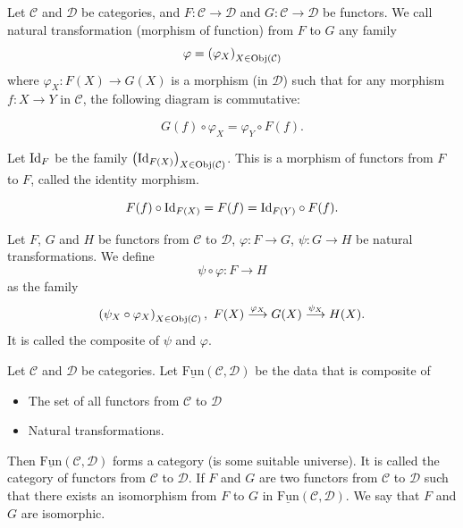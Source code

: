 \begin{definitionenv}
    Let $\mathcal{C}$ and $\mathcal{D}$ be categories, and $F:\mathcal{C}\rightarrow \mathcal{D}$ and $G:\mathcal{C}\rightarrow\mathcal{D}$ be functors. We call natural transformation (morphism of function) from $F$ to $G$ any family
    $$\varphi=\left(\varphi_X\right)_{X\in \mathrm{Obj}(\mathcal{C})}$$
    where $\varphi_X:F(X)\rightarrow G(X)$ is a morphism (in $\mathcal{D}$) such that for any morphism $f:X\rightarrow Y$ in $\mathcal{C}$, the following diagram is commutative:
    \begin{center}
\end{center}
$$G(f)\circ \varphi_X=\varphi_Y\circ F(f).$$
\end{definitionenv}
\begin{exampleenv}
    Let $\mathrm{Id}_F$ be the family $\left(\mathrm{Id}_{F(X)}\right)_{X\in \mathrm{Obj}(\mathcal{C})}$. This is a morphism of functors from $F$ to $F$, called the identity morphism.
    \begin{center}
\end{center}
$$F(f)\circ \mathrm{Id}_{F(X)} = F(f) =\mathrm{Id}_{F(Y)}\circ F(f).$$
\end{exampleenv}
\begin{exampleenv}
    Let $F$, $G$ and $H$ be functors from $\mathcal{C}$ to $\mathcal{D}$, $\varphi: F\rightarrow G$, $\psi:G\rightarrow H$ be natural transformations. We define
    $$\psi\circ \varphi: F\rightarrow H$$
    as the family 
    $$ \left(\psi_X\circ\varphi_X\right)_{X\in \Obj(\mathcal{C})},\ F(X)\overset{\varphi_X}{\longrightarrow}G(X)\overset{\psi_X}{\longrightarrow}H(X).$$
    It is called the composite of $\psi$ and $\varphi$.
\end{exampleenv}
\begin{remark}
    Let $\mathcal{C}$ and $\mathcal{D}$ be categories. Let $\underline{\mathrm{Fun}}(\mathcal{C},\mathcal{D})$ be the data that is composite of
    \begin{itemize}
        \item The set of all functors from $\mathcal{C}$ to $\mathcal{D}$
        \item Natural transformations.
    \end{itemize}
    Then $\underline{\mathrm{Fun}}(\mathcal{C},\mathcal{D})$ forms a category (is some suitable universe). It is called the category of functors from $\mathcal{C}$ to $\mathcal{D}$. If $F$ and $G$ are two functors from $\mathcal{C}$ to $\mathcal{D}$ such that there exists an isomorphism from $F$ to $G$ in $\underline{\mathrm{Fun}}(\mathcal{C},\mathcal{D})$. We say that $F$ and $G$ are isomorphic.
\end{remark}
